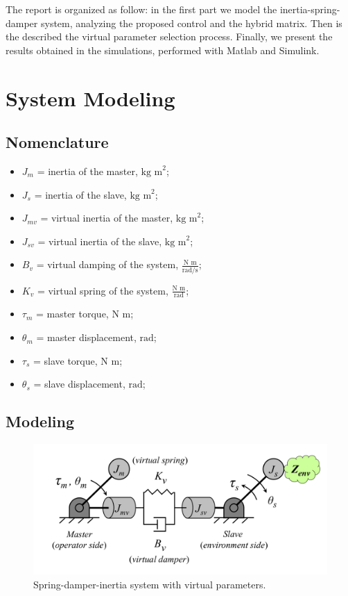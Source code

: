 
The report is organized as follow: in the first part we model the inertia-spring-damper system, analyzing the proposed control and the hybrid matrix. Then is the described the virtual parameter selection process. Finally, we present the results obtained in the simulations, performed with Matlab and Simulink.

\section{System Modeling}

\subsection*{Nomenclature}

\begin{itemize}
	\item $ J_m $ = inertia of the master, $ \text{kg m}^2 $;
	\item $ J_s $ = inertia of the slave,  $ \text{kg m}^2 $;
	\item $ J_{mv} $ = virtual inertia of the master,  $ \text{kg m}^2 $;
	\item $ J_{sv} $ = virtual inertia of the slave,  $ \text{kg m}^2 $;
	\item $ B_v $ = virtual damping of the system, $ \frac{\text{N m}}{\text{rad/s}} $;
	\item $ K_v $ = virtual spring of the system, $ \frac{\text{N m}}{\text{rad}} $;
	\item $ \tau_m $ = master torque, $ \text{N m} $;
	\item $ \theta_m $ = master displacement, $ \text{rad} $; 
	\item $ \tau_s $ = slave torque, $ \text{N m} $;
	\item $ \theta_s $ = slave displacement, $ \text{rad} $;
\end{itemize}

\subsection{Modeling}

\begin{figure}[h]
	\centering
	\includegraphics[width=0.7\linewidth]{Images/spring_damper_inertia_system}
	\caption{Spring-damper-inertia system with virtual parameters.}
	\label{fig:springdamperinertiasystem}
\end{figure}


